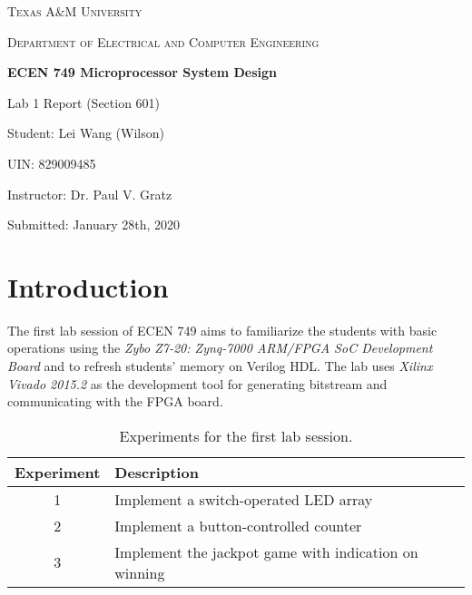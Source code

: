 \documentclass[11pt,letterpaper,titlepage]{article}
\begin{document}
\begin{titlepage}
  \centering
	{\scshape\large Texas A\&M University \par}
	\vspace{1cm}
	{\scshape\Large Department of Electrical and Computer Engineering \par}
	\vspace{4cm}
    \vspace{0.5cm}
	{\huge\bfseries ECEN 749 Microprocessor System Design\par}
	\vspace{4cm}
	{\Large Lab 1 Report (Section 601)\par}
	\vspace{1cm}
	{\Large Student: Lei Wang (Wilson)\par}
	\vspace{1cm}
	{\Large UIN: 829009485\par}
	\vspace{1cm}
	{\Large Instructor: Dr. Paul V. Gratz\par}
	\vspace{4cm}
	\vfill

	{\large Submitted: January 28th, 2020 \par}

\end{titlepage}

\newpage

\tableofcontents{}

\newpage

\part{Introduction}

The first lab session of ECEN 749 aims to familiarize the students with basic operations using the \textit{Zybo Z7-20: Zynq-7000 ARM/FPGA SoC Development Board} and to refresh students' memory on Verilog HDL. The lab uses \textit{Xilinx Vivado 2015.2} as the development tool for generating bitstream and communicating with the FPGA board.

\begin{table}[ht]
\centering
\begin{tabular}{@{}cl@{}}
\toprule
Experiment & Description                                           \\ \midrule
1          & Implement a switch-operated LED array                 \\
\midrule
2          & Implement a button-controlled counter                 \\
\midrule
3          & Implement the jackpot game with indication on winning \\ \bottomrule
\end{tabular}
\caption{Experiments for the first lab session.}
\end{table}
\end{document}
